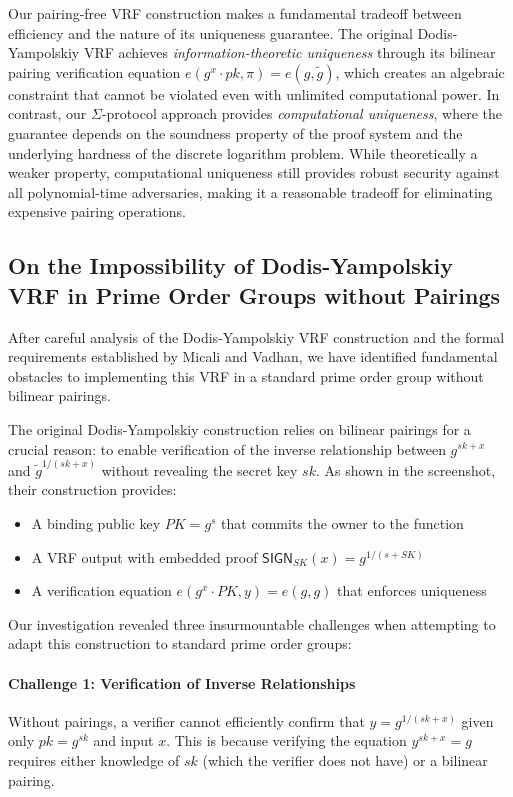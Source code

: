 Our pairing-free VRF construction makes a fundamental tradeoff between efficiency and the nature of its uniqueness guarantee. The original Dodis-Yampolskiy VRF achieves \emph{information-theoretic uniqueness} through its bilinear pairing verification equation $e(g^x \cdot pk, \pi) = e(g, \tilde{g})$, which creates an algebraic constraint that cannot be violated even with unlimited computational power. In contrast, our $\Sigma$-protocol approach provides \emph{computational uniqueness}, where the guarantee depends on the soundness property of the proof system and the underlying hardness of the discrete logarithm problem. While theoretically a weaker property, computational uniqueness still provides robust security against all polynomial-time adversaries, making it a reasonable tradeoff for eliminating expensive pairing operations.


\subsection{On the Impossibility of Dodis-Yampolskiy VRF in Prime Order Groups without Pairings}

After careful analysis of the Dodis-Yampolskiy VRF construction and the formal requirements established by Micali and Vadhan, we have identified fundamental obstacles to implementing this VRF in a standard prime order group without bilinear pairings.

The original Dodis-Yampolskiy construction relies on bilinear pairings for a crucial reason: to enable verification of the inverse relationship between $g^{sk+x}$ and $\tilde{g}^{1/(sk+x)}$ without revealing the secret key $sk$. As shown in the screenshot, their construction provides:

\begin{itemize}
    \item A binding public key $PK = g^s$ that commits the owner to the function
    \item A VRF output with embedded proof $\textsf{SIGN}_{SK}(x) = g^{1/(s+SK)}$
    \item A verification equation $e(g^x \cdot PK, y) = e(g, g)$ that enforces uniqueness
\end{itemize}

Our investigation revealed three insurmountable challenges when attempting to adapt this construction to standard prime order groups:

\paragraph{Challenge 1: Verification of Inverse Relationships} Without pairings, a verifier cannot efficiently confirm that $y = g^{1/(sk+x)}$ given only $pk = g^{sk}$ and input $x$. This is because verifying the equation $y^{sk+x} = g$ requires either knowledge of $sk$ (which the verifier does not have) or a bilinear pairing.

